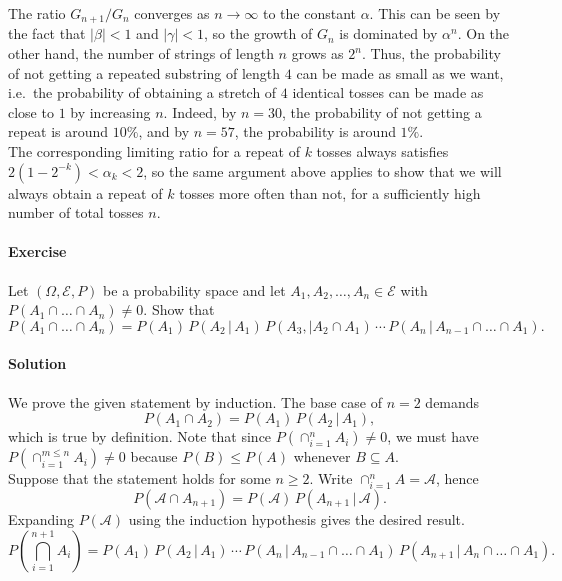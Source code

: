 \documentclass[10pt]{article}
\newcounter{prob}
\def\problem{\stepcounter{prob}\paragraph{Exercise \arabic{prob}}}
\def\solution{\paragraph{Solution}}
\begin{document}
        The ratio $G_{n + 1} / G_n$ converges as $n \to \infty$ to the constant
        $\alpha$. This can be seen by the fact that $|\beta| < 1$ and $|\gamma| <
        1$, so the growth of $G_n$ is dominated by $\alpha^n$.  On the other hand,
        the number of strings of length $n$ grows as $2^n$. Thus, the probability of
        not getting a repeated substring of length $4$ can be made as small as we
        want, i.e.\ the probability of obtaining a stretch of $4$ identical tosses
        can be made as close to $1$ by increasing $n$.  Indeed, by $n = 30$, the
        probability of not getting a repeat is around $10\%$, and by $n = 57$, the
        probability is around $1\%$. \\

        The corresponding limiting ratio for a repeat of $k$ tosses always satisfies
        $2(1 - 2^{-k}) < \alpha_k < 2$, so the same argument above applies to show
        that we will always obtain a repeat of $k$ tosses more often than not, for a
        sufficiently high number of total tosses $n$. 
        

        \problem Let $(\Omega, \mathcal{E}, P)$ be a probability space and let $A_1,
        A_2, \dots, A_n \in \mathcal{E}$ with $P(A_1\cap \dots \cap A_n) \neq 0$.
        Show that \[
            P(A_1\cap \dots \cap A_n) = P(A_1)\, P (A_2 \,|\, A_1)\, P(A_3 
            ,|A_2\cap A_1)\, \cdots\, P(A_n \,|\, A_{n-1}\cap \dots \cap A_1).
        \] 

        \solution We prove the given statement by induction. The base case of $n =
        2$ demands \[
            P(A_1\cap A_2) = P(A_1)\, P(A_2 \,|\, A_1),
        \] which is true by definition. Note that since $P(\cap_{i = 1}^n A_i) \neq
        0$, we must have $P(\cap_{i = 1}^{m \leq n} A_i) \neq 0$ because $P(B) \leq
        P(A)$ whenever $B \subseteq A$. \\

        Suppose that the statement holds for some $n \geq 2$. Write $\cap_{i = 1}^n
        A = \mathcal{A}$, hence \[
            P(\mathcal{A} \cap A_{n + 1}) = P(\mathcal{A})\, P(A_{n + 1} \,|\,
            \mathcal{A}).
        \] Expanding $P(\mathcal{A})$ using the induction hypothesis gives the
        desired result. \[
            P\left(\bigcap_{i = 1}^{n + 1} A_i\right) = P(A_1)\, P(A_2\,|\,
            A_1)\,\cdots\, P(A_n \,|\, A_{n - 1} \cap \dots \cap A_1) \,
            P(A_{n + 1} \,|\, A_n \cap \dots \cap A_1).
        \] 
\end{document}
